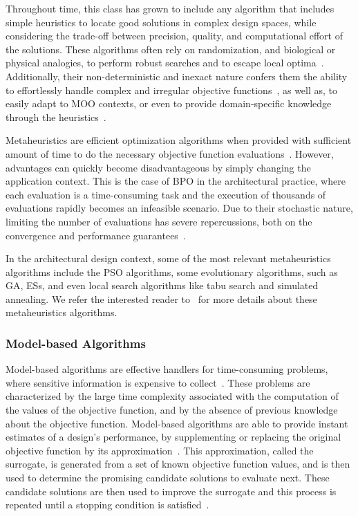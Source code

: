 	Throughout time, this class has grown to include any algorithm that includes simple heuristics to locate good solutions in complex design spaces, while considering the trade-off between precision, quality, and computational effort of the solutions. These algorithms often rely on randomization, and biological or physical analogies, to perform robust searches and to escape local optima~\cite{Glover2003Metaheuristics, Wortmann2016BBO}. Additionally, their non-deterministic and inexact nature confers them the ability to effortlessly handle complex and irregular objective functions~\cite{Wortmann2017GABESTCHOICE}, as well as, to easily adapt to \ac{MOO} contexts, or even to provide domain-specific knowledge through the heuristics~\cite{Wortmann2017GABESTCHOICE}.
	
	Metaheuristics are efficient optimization algorithms when provided with sufficient amount of time to do the necessary objective function evaluations~\cite{Conn2009}. However, advantages can quickly become disadvantageous by simply changing the application context. This is the case of \ac{BPO} in the architectural practice, where each evaluation is a time-consuming task and the execution of thousands of evaluations rapidly becomes an infeasible scenario. Due to their stochastic nature, limiting the number of evaluations has severe repercussions, both on the convergence and performance guarantees~\cite{Hasancebi2009}. 
	
	In the architectural design context, some of the most relevant metaheuristics algorithms include the \ac{PSO} algorithms, some evolutionary algorithms, such as \ac{GA}, \acp{ES}, and even local search algorithms like tabu search and simulated annealing. We refer the interested reader to~\cite{BlumRoli2003Metaheuristics,Glover2003Metaheuristics} for more details about these metaheuristics algorithms.
	
	\subsubsection{Model-based Algorithms}
	\label{ssec:model-based}
	Model-based algorithms are effective handlers for time-consuming problems, where sensitive information is expensive to collect~\cite{Forrester2009SBO, Wortmann2016BBO}. These problems are characterized by the large time complexity associated with the computation of the values of the objective function, and by the absence of previous knowledge about the objective function. Model-based algorithms are able to provide instant estimates of a design’s performance, by supplementing or replacing the original objective function by its approximation~\cite{Wortmann2016BBO}. This approximation, called the surrogate, is generated from a set of known objective function values, and is then used to determine the promising candidate solutions to evaluate next. These candidate solutions are then used to improve the surrogate and this process is repeated until a stopping condition is satisfied~\cite{Koziel2011}.
	
